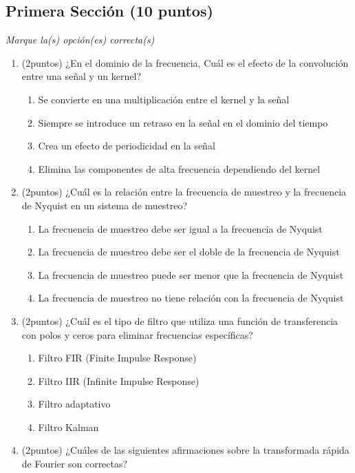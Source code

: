 \documentclass[12pt,a4paper]{article}
\providecommand{\tightlist}{%
  \setlength{\itemsep}{0pt}\setlength{\parskip}{0pt}}\usepackage{longtable,booktabs,array}
\providecommand{\tightlist}{%
  \setlength{\itemsep}{0pt}\setlength{\parskip}{2pt}}
\begin{document}
\setcounter{page}{2} %
\subsection{Primera Sección (10
puntos)}\label{primera-secciuxf3n-10-puntos}

\emph{Marque la(s) opción(es) correcta(s)}

\begin{enumerate}
\tightlist
\item
  (2puntos) ¿En el dominio de la frecuencia, Cuál es el efecto de la
  convolución entre una señal y un kernel?

  \begin{enumerate}
  \tightlist
  \item
    Se convierte en una multiplicación entre el kernel y la señal
  \item
    Siempre se introduce un retraso en la señal en el dominio del tiempo
  \item
    Crea un efecto de periodicidad en la señal
  \item
    Elimina las componentes de alta frecuencia dependiendo del kernel
  \end{enumerate}
\item
  (2puntos) ¿Cuál es la relación entre la frecuencia de muestreo y la
  frecuencia de Nyquist en un sistema de muestreo?

  \begin{enumerate}
  \tightlist
  \item
    La frecuencia de muestreo debe ser igual a la frecuencia de Nyquist
  \item
    La frecuencia de muestreo debe ser el doble de la frecuencia de
    Nyquist
  \item
    La frecuencia de muestreo puede ser menor que la frecuencia de
    Nyquist
  \item
    La frecuencia de muestreo no tiene relación con la frecuencia de
    Nyquist
  \end{enumerate}
\item
  (2puntos) ¿Cuál es el tipo de filtro que utiliza una función de
  transferencia con polos y ceros para eliminar frecuencias específicas?

  \begin{enumerate}
  \tightlist
  \item
    Filtro FIR (Finite Impulse Response)
  \item
    Filtro IIR (Infinite Impulse Response)
  \item
    Filtro adaptativo
  \item
    Filtro Kalman
  \end{enumerate}
\item
  (2puntos) ¿Cuáles de las siguientes afirmaciones sobre la transformada
  rápida de Fourier son correctas?


\end{enumerate}
\end{document}
